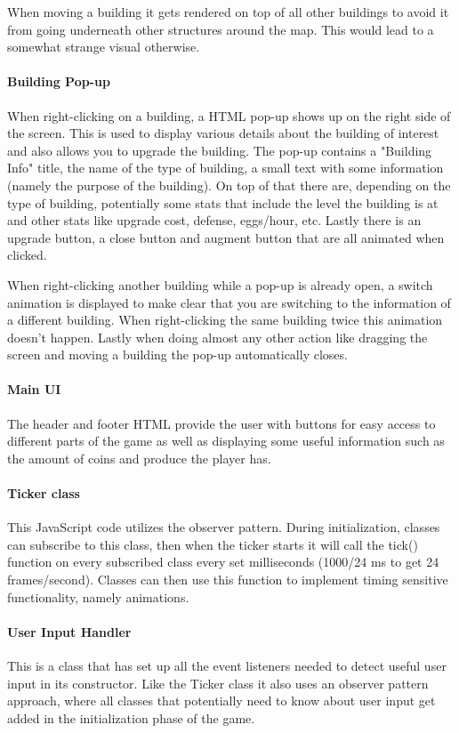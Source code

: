 \documentclass[12pt]{article}
\begin{document}
When moving a building it gets rendered on top of all other buildings to avoid it from going underneath other structures
around the map. This would lead to a somewhat strange visual otherwise.

\paragraph{Building Pop-up} When right-clicking on a building, a HTML pop-up shows up on the right side of the screen.
This is used to display various details about the building of interest and also allows you to upgrade the building. The
pop-up contains a "Building Info" title, the name of the type of building, a small text with some information (namely
the purpose of the building). On top of that there are, depending on the type of building, potentially some stats that
include the level the building is at and other stats like upgrade cost, defense, eggs/hour, etc. Lastly there is an
upgrade button, a close button and augment button that are all animated when clicked.

When right-clicking another building while a pop-up is already open, a switch animation is displayed to make clear that
you are switching to the information of a different building. When right-clicking the same building twice this animation
doesn't happen. Lastly when doing almost any other action like dragging the screen and moving a building the pop-up
automatically closes.

\paragraph{Main UI} The header and footer HTML provide the user with buttons for easy access to different parts of the
game as well as displaying some useful information such as the amount of coins and produce the player has.

\paragraph{Ticker class} This JavaScript code utilizes the observer pattern. During initialization, classes can
subscribe to this class, then when the  ticker starts it will call the tick() function on every subscribed class every
set milliseconds (1000/24 ms to get 24 frames/second). Classes can then use this function to implement timing sensitive
functionality, namely animations.

\paragraph{User Input Handler} This is a class that has set up all the event listeners needed to detect useful user
input in its constructor. Like the Ticker class it also uses an observer pattern approach, where all classes that
potentially need to know about user input get added in the initialization phase of the game.
\end{document}
